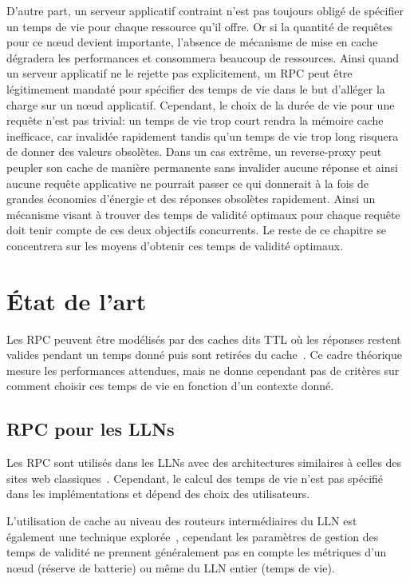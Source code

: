 D'autre part, un serveur applicatif contraint n'est pas toujours obligé de spécifier un temps de vie pour chaque ressource qu'il offre.
Or si la quantité de requêtes pour ce nœud devient importante, l'absence de mécanisme de mise en cache dégradera les performances et consommera beaucoup de ressources.
Ainsi quand un serveur applicatif ne le rejette pas explicitement, un \ac{RPC} peut être légitimement mandaté pour spécifier des temps de vie dans le but d'alléger la charge sur un nœud applicatif.
Cependant, le choix de la durée de vie pour une requête n'est pas trivial: un temps de vie trop court rendra la mémoire cache inefficace, car invalidée rapidement tandis qu'un temps de vie trop long risquera de donner des valeurs obsolètes.
Dans un cas extrême, un reverse-proxy peut peupler son cache de manière permanente sans invalider aucune réponse et ainsi aucune requête applicative ne pourrait passer ce qui donnerait à la fois de grandes économies d'énergie et des réponses obsolètes rapidement.
Ainsi un mécanisme visant à trouver des temps de validité optimaux pour chaque requête doit tenir compte de ces deux objectifs concurrents.
Le reste de ce chapitre se concentrera sur les moyens d'obtenir ces temps de validité optimaux.

\section{État de l'art}
\label{cache:related}

Les \ac{RPC} peuvent être modélisés par des caches dits \acl{TTL} où les réponses restent valides pendant un temps donné puis sont retirées du cache~\cite{berger2014exact}.
Ce cadre théorique mesure les performances attendues, mais ne donne cependant pas de critères sur comment choisir ces temps de vie en fonction d'un contexte donné.

\subsection{\ac{RPC} pour les \ac{LLN}s}

Les \ac{RPC} sont utilisés dans les \ac{LLN}s avec des architectures similaires à celles des sites web classiques~\cite{colitti2011integrating, colitti2011rest}.
Cependant, le calcul des temps de vie n'est pas spécifié dans les implémentations et dépend des choix des utilisateurs.

L'utilisation de cache au niveau des routeurs intermédiaires du \ac{LLN} est également une technique explorée~\cite{duquennoy2011leveraging}, cependant les paramètres de gestion des temps de validité ne prennent généralement pas en compte les métriques d'un nœud (réserve de batterie) ou même du \ac{LLN} entier (temps de vie).

